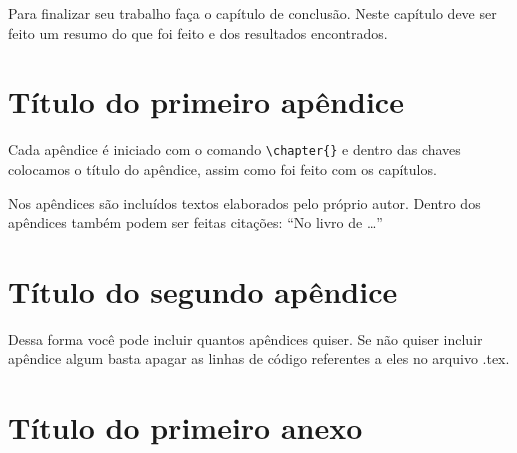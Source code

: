 \documentclass[12pt,a4paper,header]{abnt}
\begin{document}
Para finalizar seu trabalho faça o capítulo de conclusão. Neste capítulo deve ser feito um resumo do que foi feito e dos resultados encontrados. 











\apendice
\renewcommand\thechapter{\arabic{chapter}}

\chapter{Título do primeiro apêndice}

Cada apêndice é iniciado com o comando \verb|\chapter{}| e dentro das chaves colocamos o título do apêndice, assim como foi feito com os capítulos. 

Nos apêndices são incluídos textos elaborados pelo próprio autor. Dentro dos a\-pên\-di\-ces também podem ser feitas citações: ``No livro de  \ldots''

\chapter{Título do segundo apêndice}
Dessa forma você pode incluir quantos apêndices quiser. Se não quiser incluir apêndice algum basta apagar as linhas de código referentes a eles no arquivo .tex. 







\anexo
\renewcommand\thechapter{\arabic{chapter}}

\chapter{Título do primeiro anexo}
\end{document}
